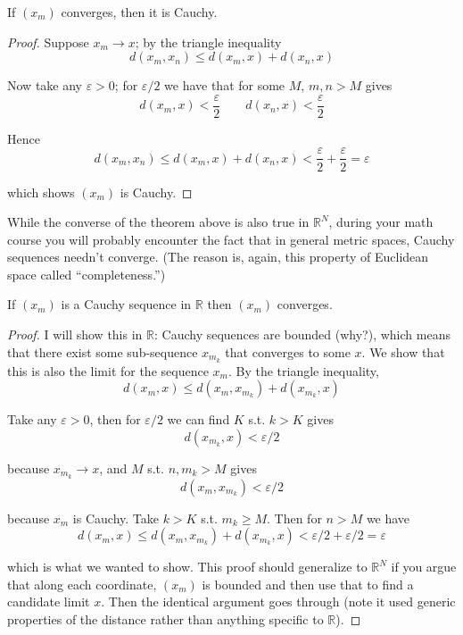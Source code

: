 \documentclass{article}
\begin{document}
\begin{theorem}
  If $(x_m)$ converges, then it is Cauchy.
\end{theorem}

\begin{proof}
  Suppose $x_m \to x$; by the triangle inequality
  \[
    d(x_m, x_n) \le d(x_m, x) + d(x_n, x)
  \]

  Now take any $\varepsilon > 0$; for $\varepsilon / 2$ we have that for some $M$, $m, n > M$ gives
  \[
    d(x_m, x) < \dfrac{\varepsilon}{2}
    \quad\quad
    d(x_n, x) < \dfrac{\varepsilon}{2}
  \]

  Hence
  \[
    d(x_m, x_n) \le d(x_m, x) + d(x_n, x) < \dfrac{\varepsilon}{2} +  \dfrac{\varepsilon}{2} = \varepsilon
  \]

  which shows $(x_m)$ is Cauchy.
\end{proof}

While the converse of the theorem above is also true in $\mathbb{R}^N$, during your math course you will probably encounter the fact that in general metric spaces, Cauchy sequences needn't converge. (The reason is, again, this property of Euclidean space called ``completeness.'')
\begin{theorem}
  If $(x_m)$ is a Cauchy sequence in $\mathbb{R}$ then $(x_m)$ converges.
\end{theorem}

\begin{proof}
  I will show this in $\mathbb{R}$: Cauchy sequences are bounded (why?), which means that there exist some sub-sequence $x_{m_k}$ that converges to some $x$. We show that this is also the limit for the sequence $x_m$. By the triangle inequality,
  \[
    d(x_m, x) \le d(x_m, x_{m_k}) + d(x_{m_k}, x)
  \]

  Take any $\varepsilon > 0$, then for $\varepsilon / 2$ we can find $K$ s.t. $k > K$ gives
  \[
    d(x_{m_k}, x) < \varepsilon / 2
  \]

  because $x_{m_k} \to x$, and $M$ s.t. $n, m_k > M$ gives
  \[
    d(x_m, x_{m_k}) < \varepsilon / 2
  \]

  because $x_m$ is Cauchy. Take $k > K$ s.t. $m_k \ge M$. Then for $n > M$ we have
  \[
    d(x_m, x) \le d(x_m, x_{m_k}) + d(x_{m_k}, x) < \varepsilon / 2 + \varepsilon / 2 = \varepsilon
  \]

  which is what we wanted to show. This proof should generalize to $\mathbb{R}^N$ if you argue that along each coordinate, $(x_m)$ is bounded and then use that to find a candidate limit $x$. Then the identical argument goes through (note it used generic properties of the distance rather than anything specific to $\mathbb{R}$).
\end{proof}
\end{document}
